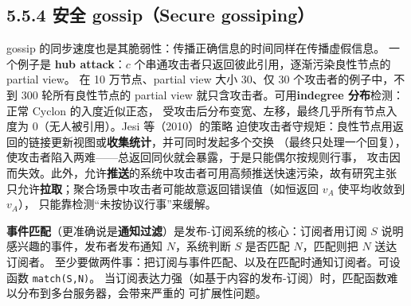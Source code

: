 \subsection*{5.5.4 安全 gossip（Secure gossiping）}
gossip 的同步速度也是其脆弱性：传播正确信息的时间同样在传播虚假信息。
一个例子是 \textbf{hub attack}：$c$ 个串通攻击者只返回彼此引用，逐渐污染良性节点的 partial view。
在 10 万节点、partial view 大小 30、仅 30 个攻击者的例子中，不到 300 轮所有良性节点的
partial view 就只含攻击者。可用\textbf{indegree 分布}检测：正常 Cyclon 的入度近似正态，
受攻击后分布变宽、左移，最终几乎所有节点入度为 0（无人被引用）。Jesi 等（2010）的策略
迫使攻击者守规矩：良性节点用返回的链接更新视图或\textbf{收集统计}，并可同时发起多个交换
（最终只处理一个回复），使攻击者陷入两难——总返回同伙就会暴露，于是只能偶尔按规则行事，
攻击因而失效。此外，允许\textbf{推送}的系统中攻击者可用高频推送快速污染，故有研究主张
只允许\textbf{拉取}；聚合场景中攻击者可能故意返回错误值（如恒返回 $v_A$ 使平均收敛到 $v_A$），
只能靠检测“未按协议行事”来缓解。

\begin{closeread}
\end{closeread}



\textbf{事件匹配}（更准确说是\textbf{通知过滤}）是发布-订阅系统的核心：订阅者用订阅 $S$
说明感兴趣的事件，发布者发布通知 $N$，系统判断 $S$ 是否匹配 $N$，匹配则把 $N$ 送达订阅者。
至少要做两件事：把订阅与事件匹配、以及在匹配时通知订阅者。可设函数 \texttt{match(S,N)}。
当订阅表达力强（如基于内容的发布-订阅）时，匹配函数难以分布到多台服务器，会带来严重的
可扩展性问题。


